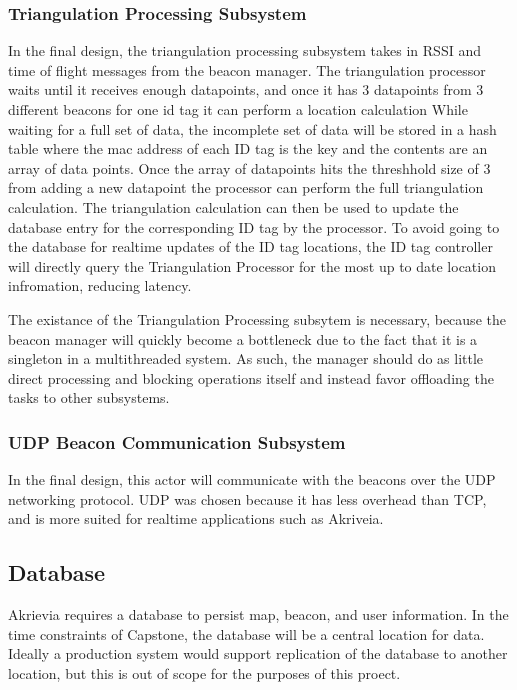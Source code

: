 \subsubsection{Triangulation Processing Subsystem}
In the final design, the triangulation processing subsystem takes in RSSI and time of flight messages from the beacon manager.
The triangulation processor waits until it receives enough datapoints, and once it has 3 datapoints from 3 different beacons for one id tag it can perform a location calculation
While waiting for a full set of data, the incomplete set of data will be stored in a hash table where the mac address of each ID tag is the key and the contents are an array of data points.
Once the array of datapoints hits the threshhold size of 3 from adding a new datapoint the processor can perform the full triangulation calculation.
The triangulation calculation can then be used to update the database entry for the corresponding ID tag by the processor.
To avoid going to the database for realtime updates of the ID tag locations, the ID tag controller will directly query the Triangulation Processor for the most up to date location infromation, reducing latency.

\bigskip
The existance of the Triangulation Processing subsytem is necessary, because the beacon manager will quickly become a bottleneck due to the fact that it is a singleton in a multithreaded system.
As such, the manager should do as little direct processing and blocking operations itself and instead favor offloading the tasks to other subsystems.

\medskip
\subsubsection{UDP Beacon Communication Subsystem}
In the final design, this actor will communicate with the beacons over the UDP networking protocol.
UDP was chosen because it has less overhead than TCP, and is more suited for realtime applications such as Akriveia.

\medskip
\subsection{Database}
Akrievia requires a database to persist map, beacon, and user information.
In the time constraints of Capstone, the database will be a central location for data.
Ideally a production system would support replication of the database to another location, but this is out of scope for the purposes of this proect.

